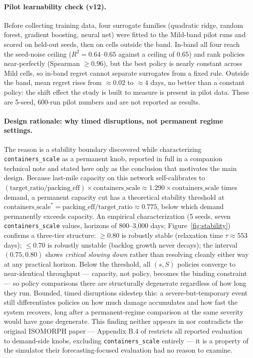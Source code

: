 \documentclass[12pt,a4paper]{article}
\begin{document}
\paragraph{Pilot learnability check (v12).} Before collecting training data, four surrogate families (quadratic ridge, random forest, gradient boosting, neural net) were fitted to the Mild-band pilot runs and scored on held-out seeds, then on cells outside the band. In-band all four reach the seed-noise ceiling ($R^2=0.64$--$0.65$ against a ceiling of $0.65$) and rank policies near-perfectly (Spearman $\geq0.96$), but the best policy is nearly constant across Mild cells, so in-band regret cannot separate surrogates from a fixed rule. Outside the band, mean regret rises from $\approx0.02$ to $\approx4$ days, no better than a constant policy: the shift effect the study is built to measure is present in pilot data. These are 5-seed, 600-run pilot numbers and are not reported as results.

\paragraph{Design rationale: why timed disruptions, not permanent regime settings.} The reason is a stability boundary discovered while characterizing \texttt{containers\_scale} as a permanent knob, reported in full in a companion technical note and stated here only as the conclusion that motivates the main design. Because last-mile capacity on this network self-calibrates to $(\text{target\_ratio}/\text{packing\_eff}) \times \text{containers\_scale} \approx 1.290 \times \text{containers\_scale}$ times demand, a permanent capacity cut has a theoretical stability threshold at $\text{containers\_scale}^{*} = \text{packing\_eff}/\text{target\_ratio} \approx 0.775$, below which demand permanently exceeds capacity. An empirical characterization (5 seeds, seven \texttt{containers\_scale} values, horizons of 800--3{,}000 days; Figure~\ref{fig:stability}) confirms a three-tier structure: $\geq$0.80 is robustly stable (relaxation time $\tau\approx553$ days); $\leq$0.70 is robustly unstable (backlog growth never decays); the interval $(0.75, 0.80)$ shows \emph{critical slowing down} \citep{whitt2002} rather than resolving cleanly either way at any practical horizon. Below the threshold, all $(s,S)$ policies converge to near-identical throughput --- capacity, not policy, becomes the binding constraint --- so policy comparisons there are structurally degenerate regardless of how long they run. Bounded, timed disruptions sidestep this: a severe-but-temporary event still differentiates policies on how much damage accumulates and how fast the system recovers, long after a permanent-regime comparison at the same severity would have gone degenerate. This finding neither appears in nor contradicts the original ISOMORPH paper --- Appendix B.4 of \citet{zhang2026isomorph} restricts all reported evaluation to demand-side knobs, excluding \texttt{containers\_scale} entirely --- it is a property of the simulator their forecasting-focused evaluation had no reason to examine.
\end{document}
